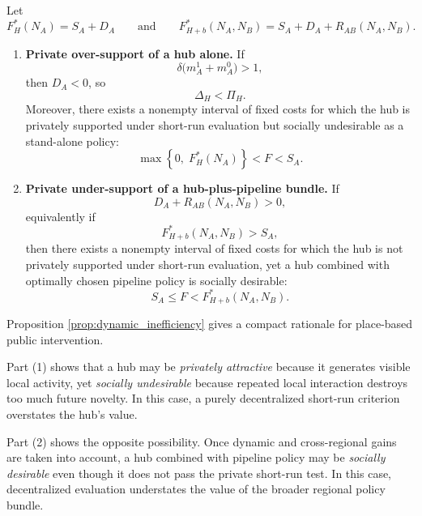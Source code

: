 \begin{proposition}
\label{prop:dynamic_inefficiency}
Let
\[
F_H^*(N_A)=S_A+D_A
\qquad\text{and}\qquad
F_{H+b}^*(N_A,N_B)=S_A+D_A+R_{AB}(N_A,N_B).
\]

\begin{enumerate}[leftmargin=2em]
    \item \textbf{Private over-support of a hub alone.}
    If
    \begin{equation}
    \delta\bigl(m_A^1+m_A^0\bigr)>1,
    \label{eq:dynamic_gap}
    \end{equation}
    then $D_A<0$, so
    \[
    \Delta_H<\Pi_H.
    \]
    Moreover, there exists a nonempty interval of fixed costs for which the hub is privately supported under short-run evaluation but socially undesirable as a stand-alone policy:
    \begin{equation}
    \max\!\left\{0,\;F_H^*(N_A)\right\}
    <
    F
    <
    S_A.
    \label{eq:dynamic_inefficiency_interval}
    \end{equation}

    \item \textbf{Private under-support of a hub-plus-pipeline bundle.}
    If
    \begin{equation}
    D_A+R_{AB}(N_A,N_B)>0,
    \label{eq:bundle_gap_condition}
    \end{equation}
    equivalently if
    \[
    F_{H+b}^*(N_A,N_B)>S_A,
    \]
    then there exists a nonempty interval of fixed costs for which the hub is not privately supported under short-run evaluation, yet a hub combined with optimally chosen pipeline policy is socially desirable:
    \begin{equation}
    S_A
    \le
    F
    <
    F_{H+b}^*(N_A,N_B).
    \label{eq:under_support_interval}
    \end{equation}
\end{enumerate}
\end{proposition}

Proposition \ref{prop:dynamic_inefficiency} gives a compact rationale for place-based public intervention.

Part (1) shows that a hub may be \emph{privately attractive} because it generates visible local activity, yet \emph{socially undesirable} because repeated local interaction destroys too much future novelty. In this case, a purely decentralized short-run criterion overstates the hub's value.

Part (2) shows the opposite possibility. Once dynamic and cross-regional gains are taken into account, a hub combined with pipeline policy may be \emph{socially desirable} even though it does not pass the private short-run test. In this case, decentralized evaluation understates the value of the broader regional policy bundle.

